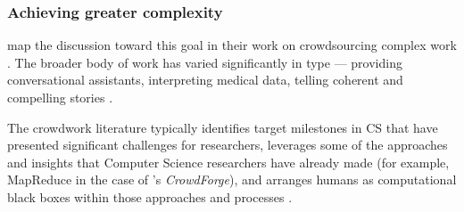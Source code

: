 \documentclass[trackingWork]{subfiles}
\begin{document}
\subsubsection{Achieving greater complexity
}\label{sec:Complexity}

\citeauthor{crowdForgeKittur}
map the discussion toward this goal in their work on
crowdsourcing complex work
\cite{crowdForgeKittur}.
The broader body of work has varied significantly in type
--- providing conversational assistants,
interpreting medical data,
telling coherent and compelling stories
\cite{Lasecki:2013:CCC:2501988.2502057,mavandadi2012distributed,KimStoria}.

The crowdwork literature typically identifies target milestones in CS
that have presented significant challenges for researchers,
leverages some of the approaches and insights that Computer Science researchers have already made
(for example, MapReduce in the case of \citeauthor{crowdForgeKittur}'s \textit{CrowdForge}),
and arranges humans as computational black boxes within those approaches and processes
\cite[][and others]{foundry,crowdForgeKittur}.


\end{document}

